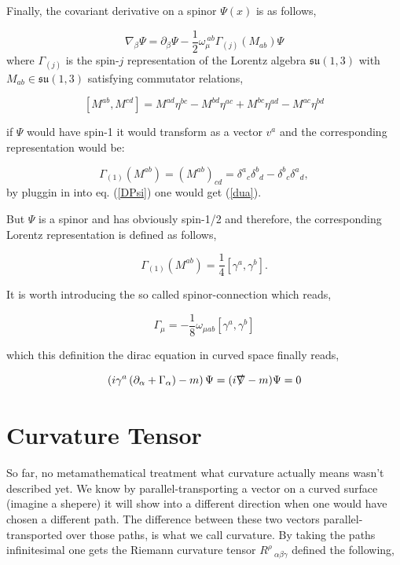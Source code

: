 \documentclass[12pt,a4paper]{article}
\begin{document}
	Finally, the covariant derivative on a spinor $\Psi(x)$ is as follows,
	
	\begin{equation}
		\label{DPsi}
		\nabla_\beta \Psi = \partial_\beta \Psi - \frac{1}{2} \omega_\mu^{\ a b }\Gamma_{(j)}(M_{a b})\Psi
	\end{equation}
	where $\Gamma_{(j)}$ is the spin-$j$ representation of the Lorentz algebra $\mathfrak{su}(1,3)$
	with $M_{a b} \in \mathfrak{su}(1,3)$ satisfying commutator relations,
	
	$$
	[M^{a b },M^{c d }]=M^{a d }\eta ^{b c }-M^{b d }\eta ^{a c }+M^{b c }\eta ^{a d }-M^{a c }\eta ^{b d }
	$$
	
	if $\Psi$ would have spin-1 it would transform as a vector $v^a$ and the corresponding representation would be:
	
	$$
	\Gamma_{(1)}(M^{a b }) = (M^{a b })_{c d }=\delta ^{a }{}_{c }\delta ^{b }{}_{d }-\delta ^{b }{}_{c }\delta ^{a }{}_{d },
	$$
	by pluggin in into eq. (\ref{DPsi}) one would get (\ref{dua}).
	
	But $\Psi$ is a spinor and has obviously spin-1/2 and therefore, the corresponding Lorentz representation is defined as follows,
	
	$$
	\Gamma_{(1)}(M^{a b }) = \frac{1}{4}[\gamma^a, \gamma^b].
	$$
	
	It is worth introducing the so called spinor-connection which reads,
	
	$$
	\Gamma_\mu = -\frac{1}{8} \omega_{\mu a b}[\gamma^a, \gamma^b]
	$$

	which this definition the dirac equation in curved space finally reads,
	
	
	\begin{equation}
	\left(i\gamma^a \left( \partial_\alpha + \Gamma_\alpha \right)-m\right)\Psi = (i\slashed{\nabla} - m)\Psi = 0
	\end{equation}
	\section{Curvature Tensor}
	So far, no metamathematical treatment what curvature actually means wasn't described yet.  We know by parallel-transporting a vector on a curved surface (imagine a shepere) it will show into a different direction when one would have chosen a different path. The difference between these two vectors parallel-transported over those paths, is what we call curvature. By taking the paths infinitesimal one gets the Riemann curvature tensor $R^\rho\,_{\alpha \beta  \gamma }$ defined the following,
	
\end{document}
